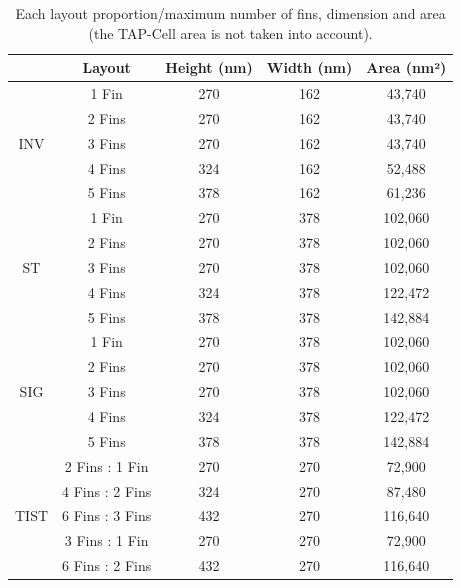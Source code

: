 \documentclass[pgmicro,mestrado,english]{iiufrgs}
\begin{document}
\begin{table}[]
\centering
\caption{Each layout proportion/maximum number of fins, dimension and area (the TAP-Cell area is not taken into account).}
\label{tab:areas}
\begin{tabular}{|c|c|c|c|c|}
\hline
                      & Layout & Height (nm) & Width (nm) & Area (nm²) \\ \hline
\multirow{5}{*}{INV}  & 1 Fin             & 270         & 162        & 43,740  \\ \cline{2-5}
                      & 2 Fins             & 270         & 162        & 43,740  \\ \cline{2-5}
                      & 3 Fins             & 270         & 162        & 43,740  \\ \cline{2-5}
                      & 4 Fins             & 324         & 162        & 52,488 \\ \cline{2-5}
                      & 5 Fins             & 378         & 162        & 61,236 \\ \hline
\multirow{5}{*}{ST}   & 1 Fin             & 270         & 378        & 102,060 \\ \cline{2-5}
                      & 2 Fins             & 270         & 378        & 102,060 \\ \cline{2-5}
                      & 3 Fins             & 270         & 378        & 102,060 \\ \cline{2-5}
                      & 4 Fins             & 324         & 378        & 122,472 \\ \cline{2-5}
                      & 5 Fins             & 378         & 378        & 142,884 \\ \hline
\multirow{5}{*}{SIG}  & 1 Fin             & 270         & 378        & 102,060 \\ \cline{2-5}
                      & 2 Fins             & 270         & 378        & 102,060 \\ \cline{2-5}
                      & 3 Fins             & 270         & 378        & 102,060 \\ \cline{2-5}
                      & 4 Fins             & 324         & 378        & 122,472 \\ \cline{2-5}
                      & 5 Fins             & 378         & 378        & 142,884 \\ \hline
\multirow{5}{*}{TIST} & 2 Fins : 1 Fin             & 270         & 270        & 72,900 \\ \cline{2-5}
                      & 4 Fins : 2 Fins             & 324         & 270        & 87,480  \\ \cline{2-5}
                      & 6 Fins : 3 Fins             & 432         & 270        & 116,640  \\ \cline{2-5}
                      & 3 Fins : 1 Fin             & 270         & 270        & 72,900 \\ \cline{2-5}
                      & 6 Fins : 2 Fins             & 432         & 270        & 116,640  \\ \hline
\end{tabular}
\end{table}
\end{document}
